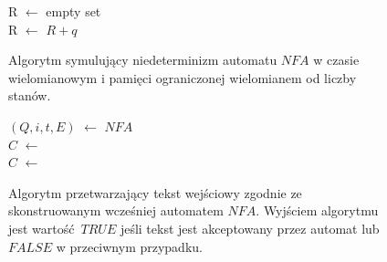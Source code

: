 \begin{figure}
	\centering
	{\small
		\begin{pseudokod}[H]
		{
			R $\leftarrow$ empty set \\
			{
				{
					R $\leftarrow$ $R + {q}$
				}
			}
		}
		\caption{Algorytm symulujący niedeterminizm automatu $NFA$ w czasie wielomianowym i pamięci ograniczonej wielomianem
				od liczby stanów.}
		\label{alg:Transitions}
		\end{pseudokod}
	}
\end{figure}

\begin{figure}
	\centering
	{\small
		\begin{pseudokod}[H]
		{
			$(Q, i, {t}, E)$ $\leftarrow$ $NFA$ \\
			$C$ $\leftarrow$  \\
			{
				$C$ $\leftarrow$  \\
			}
		}
		\caption{Algorytm przetwarzający tekst wejściowy zgodnie ze skonstruowanym wcześniej automatem $NFA$. Wyjściem algorytmu 
		jest wartość $TRUE$ jeśli tekst jest akceptowany przez automat lub $FALSE$ w przeciwnym przypadku.}
		\label{alg:RegularExpressionTester}
		\end{pseudokod}
	}
\end{figure}
